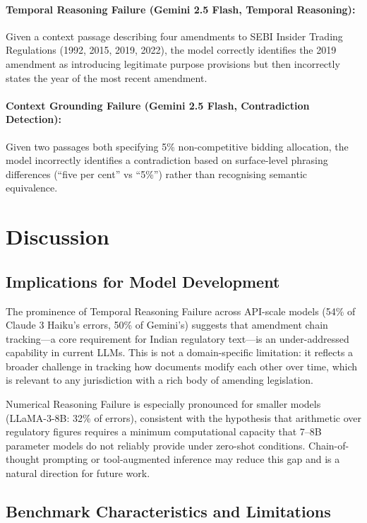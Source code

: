 \documentclass[11pt]{article}
\begin{document}
\paragraph{Temporal Reasoning Failure (Gemini 2.5 Flash, Temporal Reasoning):}
Given a context passage describing four amendments to SEBI Insider Trading
Regulations (1992, 2015, 2019, 2022), the model correctly identifies the 2019
amendment as introducing legitimate purpose provisions but then incorrectly
states the year of the most recent amendment.

\paragraph{Context Grounding Failure (Gemini 2.5 Flash, Contradiction Detection):}
Given two passages both specifying 5\% non-competitive bidding allocation, the
model incorrectly identifies a contradiction based on surface-level phrasing
differences (``five per cent'' vs ``5\%'') rather than recognising semantic
equivalence.

\section{Discussion}

\subsection{Implications for Model Development}

The prominence of Temporal Reasoning Failure across API-scale models (54\% of
Claude 3 Haiku's errors, 50\% of Gemini's) suggests that amendment chain
tracking---a core requirement for Indian regulatory text---is an under-addressed
capability in current LLMs. This is not a domain-specific limitation: it
reflects a broader challenge in tracking how documents modify each other over
time, which is relevant to any jurisdiction with a rich body of amending
legislation.

Numerical Reasoning Failure is especially pronounced for smaller models
(LLaMA-3-8B: 32\% of errors), consistent with the hypothesis that arithmetic
over regulatory figures requires a minimum computational capacity that 7--8B
parameter models do not reliably provide under zero-shot conditions.
Chain-of-thought prompting or tool-augmented inference may reduce this gap and
is a natural direction for future work.

\subsection{Benchmark Characteristics and Limitations}
\end{document}
